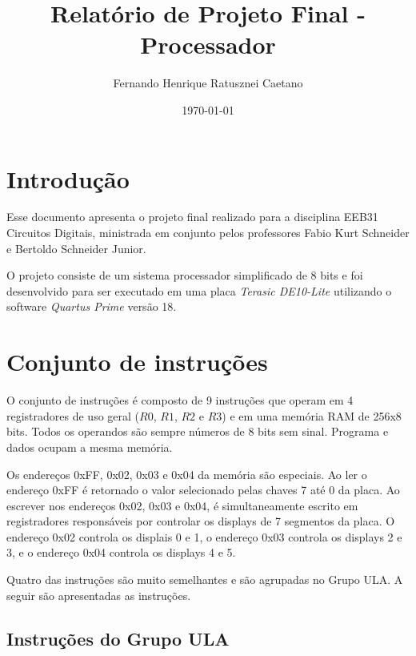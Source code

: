 \documentclass[a4paper, 12pt]{article}
\title{Relatório de Projeto Final - Processador}
\author{Fernando Henrique Ratusznei Caetano}
\date{\today}
\begin{document}
\maketitle
\tableofcontents

\newpage
\section{Introdução}

\par
Esse documento apresenta o projeto final realizado para a disciplina
EEB31 \- Circuitos Digitais, ministrada em conjunto pelos professores
Fabio Kurt Schneider e Bertoldo Schneider Junior.

\par
O projeto consiste de um sistema processador simplificado de 8 bits
e foi desenvolvido para ser executado em uma placa \textit{Terasic DE10-Lite}
utilizando o software \textit{Quartus Prime} versão 18.

\newpage
\section{Conjunto de instruções}
\par
O conjunto de instruções é composto de 9 instruções que operam em 4
registradores de uso geral ($R0$, $R1$, $R2$ e $R3$) e em uma memória
RAM de 256x8 bits. Todos os operandos são sempre números de 8 bits sem
sinal. Programa e dados ocupam a mesma memória.

Os endereços 0xFF, 0x02, 0x03 e 0x04 da memória são especiais.
Ao ler o endereço 0xFF é retornado o valor selecionado pelas chaves
7 até 0 da placa. Ao escrever nos endereços 0x02, 0x03 e 0x04, é simultaneamente
escrito em registradores responsáveis por controlar os displays de 7 segmentos
da placa. O endereço 0x02 controla os displais 0 e 1, o endereço 0x03 controla os 
displays 2 e 3, e o endereço 0x04 controla os displays 4 e 5.

Quatro das instruções são muito semelhantes e são agrupadas no Grupo ULA.
A seguir são apresentadas as instruções.

\subsection{Instruções do Grupo ULA}
\begin{table}[ht]
	\centering
	\caption{Formato das instruções codificadas no Grupo ULA}
	\label{tab:ula_format}
\end{table}
\end{document}
